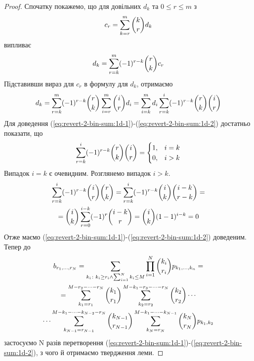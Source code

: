 \documentclass{KnuBulletin}
\begin{document}
\begin{multicols}{2}
    \begin{proof}
        Спочатку покажемо, що для довільних $d_k$ та $0\le r \le m$ з
        \begin{gather}
        \label{eq:revert-2-bin-sum:1d-1}
        c_r=\sum_{k=r}^m \dbinom{k}{r}d_k
        \end{gather}
        випливає 
        \begin{gather}
        \label{eq:revert-2-bin-sum:1d-2}
        d_k=\sum_{r=k}^m (-1)^{r-k} \dbinom{r}{k}c_r
        \end{gather}
        Підставивши вираз для $c_r$ в формулу для $d_k$, отримаємо
        \begin{gather*}
        d_k=\sum_{r=k}^m (-1)^{r-k} \dbinom{r}{k}
        \sum_{i=r}^m \dbinom{i}{r}d_i
        = \sum_{i=k}^m d_i
        \sum_{r=k}^i 
        (-1)^{r-k} \dbinom{r}{k} \dbinom{i}{r}
        \end{gather*}
        Для доведення 
        (\ref{eq:revert-2-bin-sum:1d-1})-(\ref{eq:revert-2-bin-sum:1d-2}) 
        достатньо показати, що 
        \begin{gather*}
        \sum_{r=k}^i (-1)^{r-k} \dbinom{r}{k} \dbinom{i}{r} 
        =\begin{cases}
        1,&i=k\\
        0,&i>k
        \end{cases}
        \end{gather*}
        Випадок $i=k$ є очевидним. Розглянемо випадок $i>k$.
        \begin{multline*}
        \sum_{r=k}^i (-1)^{r-k} \dbinom{i}{r}\dbinom{r}{k}
        =\sum_{r=k}^i (-1)^{r-k} \dbinom{i}{k}\dbinom{i-k}{r-k}
        =\\=
        \dbinom{i}{k}\sum_{r=0}^{i-k} (-1)^{r} \dbinom{i-k}{r}
        =\dbinom{i}{k}(1-1)^{i-k}=0
        \end{multline*}
        Отже маємо (\ref{eq:revert-2-bin-sum:1d-1})-(\ref{eq:revert-2-bin-sum:1d-2}) доведеним.
        Тепер до
        \begin{multline*}
            b_{r_1,\dots,r_N}
            =\sum_{k_i\colon k_i \ge r_i \wedge \sum_{i=1}^N k_i \le M} \prod_{i=1}^N \dbinom{k_i}{r_i} p_{k_1,\dots,k_n}
            =\\=
            \sum_{k_1=r_1}^{M-r_2-\dots-r_N}
            \dbinom{k_1}{r_1} 
            \sum_{k_2=r_2}^{M-k_1-r_3-\dots-r_N}
            \dbinom{k_2}{r_2} 
            \cdots\\\cdots
            \sum_{k_{N-1}=r_{N-1}}^{M-k_1-\dots-k_{N-2}-r_N}
            \dbinom{k_{N-1}}{r_{N-1}} 
            \sum_{k_N=r_N}^{M-k_1-\dots-k_{N-1}}
            \dbinom{k_N}{r_N} 
            p_{k_1,k_2}
        \end{multline*}
        застосуємо N разів перетворення (\ref{eq:revert-2-bin-sum:1d-1})-(\ref{eq:revert-2-bin-sum:1d-2}), 
        з чого й отримаємо твердження леми.
    \end{proof}
    

\end{multicols}
\end{document}
